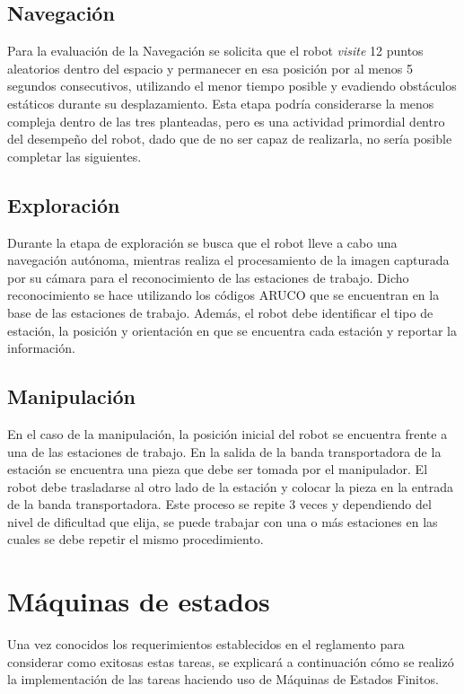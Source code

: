 \subsection{Navegación}
Para la evaluación de la Navegación se solicita que el robot \textit{visite} 12 puntos aleatorios dentro del espacio y permanecer en esa posición por al menos 5 segundos consecutivos, utilizando el menor tiempo posible y evadiendo obstáculos estáticos durante su desplazamiento.
Esta etapa podría considerarse la menos compleja dentro de las tres planteadas, pero es una actividad primordial dentro del desempeño del robot, dado que de no ser capaz de realizarla, no sería posible completar las siguientes.

\subsection{Exploración}
Durante la etapa de exploración se busca que el robot lleve a cabo una navegación autónoma, mientras realiza el procesamiento de la imagen capturada por su cámara para el reconocimiento de las estaciones de trabajo. Dicho reconocimiento se hace utilizando los códigos ARUCO que se encuentran en la base de las estaciones de trabajo. Además, el robot debe identificar el tipo de estación, la posición y orientación en que se encuentra cada estación y reportar la información.

\subsection{Manipulación}
En el caso de la manipulación, la posición inicial del robot se encuentra frente a una de las estaciones de trabajo. En la salida de la banda transportadora de la estación se encuentra una pieza que debe ser tomada por el manipulador. El robot debe trasladarse al otro lado de la estación y colocar la pieza en la entrada de la banda transportadora. Este proceso se repite 3 veces y dependiendo del nivel de dificultad que elija, se puede trabajar con una o más estaciones en las cuales se debe repetir el mismo procedimiento. 

\section{Máquinas de estados}
Una vez conocidos los requerimientos establecidos en el reglamento para considerar como exitosas estas tareas, se explicará a continuación cómo se realizó la implementación de las tareas haciendo uso de Máquinas de Estados Finitos.

